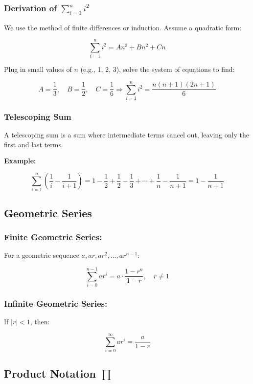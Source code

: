 \subsubsection{Derivation of \texorpdfstring{\(\sum_{i=1}^{n} i^2\)}{∑i²}}

We use the method of finite differences or induction. Assume a quadratic form:

\[
    \sum_{i=1}^{n} i^2 = An^3 + Bn^2 + Cn
\]

Plug in small values of \(n\) (e.g., 1, 2, 3), solve the system of equations to find:

\[
    A = \frac{1}{3}, \quad B = \frac{1}{2}, \quad C = \frac{1}{6}
    \Rightarrow \sum_{i = 1}^{n} i^2 = \frac{n(n+1)(2n+1)}{6}
\]

\subsubsection{Telescoping Sum}

A telescoping sum is a sum where intermediate terms cancel out, leaving only the first and last terms.

\textbf{Example:}

\[
    \sum_{i=1}^{n} \left( \frac{1}{i} - \frac{1}{i+1} \right)
    = 1 - \frac{1}{2} + \frac{1}{2} - \frac{1}{3} + \cdots + \frac{1}{n} - \frac{1}{n+1}
    = 1 - \frac{1}{n+1}
\]

\subsection{Geometric Series}

\subsubsection{Finite Geometric Series:}

For a geometric sequence \(a, ar, ar^2, \dots, ar^{n-1}\):

\[
    \sum_{i = 0}^{n - 1} ar^i = a \cdot \frac{1 - r^n}{1 - r}, \quad r \ne 1
\]

\subsubsection{Infinite Geometric Series:}

If \(|r| < 1\), then:

\[
    \sum_{i = 0}^{\infty} ar^i = \frac{a}{1 - r}
\]

\subsection{Product Notation \texorpdfstring{\(\prod\)}{∏}}

